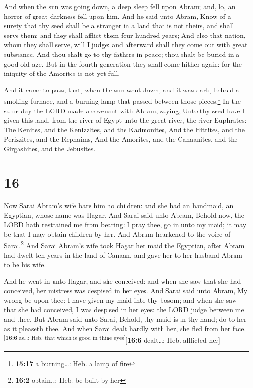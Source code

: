 And when the sun was going down, a deep sleep fell upon
Abram; and, lo, an horror of great darkness fell upon him.
 And he said unto Abram, Know of a surety that thy seed
shall be a stranger in a land that is not theirs, and shall serve them;
and they shall afflict them four hundred years;  And also
that nation, whom they shall serve, will I judge: and afterward shall
they come out with great substance.  And thou shalt go to
thy fathers in peace; thou shalt be buried in a good old age.
 But in the fourth generation they shall come hither
again: for the iniquity of the Amorites is not yet full.

 And it came to pass, that, when the sun went down, and
it was dark, behold a smoking furnace, and a burning lamp that passed
between those pieces.\footnote{\textbf{15:17} a burning\ldots: Heb. a
  lamp of fire}  In the same day the LORD made a covenant
with Abram, saying, Unto thy seed have I given this land, from the river
of Egypt unto the great river, the river Euphrates:  The
Kenites, and the Kenizzites, and the Kadmonites,  And the
Hittites, and the Perizzites, and the Rephaims,  And the
Amorites, and the Canaanites, and the Girgashites, and the Jebusites.

\hypertarget{section-15}{%
\section{16}\label{section-15}}

 Now Sarai Abram's wife bare him no children: and she had
an handmaid, an Egyptian, whose name was Hagar.  And Sarai
said unto Abram, Behold now, the LORD hath restrained me from bearing: I
pray thee, go in unto my maid; it may be that I may obtain children by
her. And Abram hearkened to the voice of Sarai.\footnote{\textbf{16:2}
  obtain\ldots: Heb. be built by her}  And Sarai Abram's
wife took Hagar her maid the Egyptian, after Abram had dwelt ten years
in the land of Canaan, and gave her to her husband Abram to be his wife.

 And he went in unto Hagar, and she conceived: and when
she saw that she had conceived, her mistress was despised in her eyes.
 And Sarai said unto Abram, My wrong be upon thee: I have
given my maid into thy bosom; and when she saw that she had conceived, I
was despised in her eyes: the LORD judge between me and thee.
 But Abram said unto Sarai, Behold, thy maid is in thy
hand; do to her as it pleaseth thee. And when Sarai dealt hardly with
her, she fled from her face.\textsuperscript{{[}\textbf{16:6} as\ldots:
Heb. that which is good in thine eyes{]}}{[}\textbf{16:6} dealt\ldots:
Heb. afflicted her{]}


